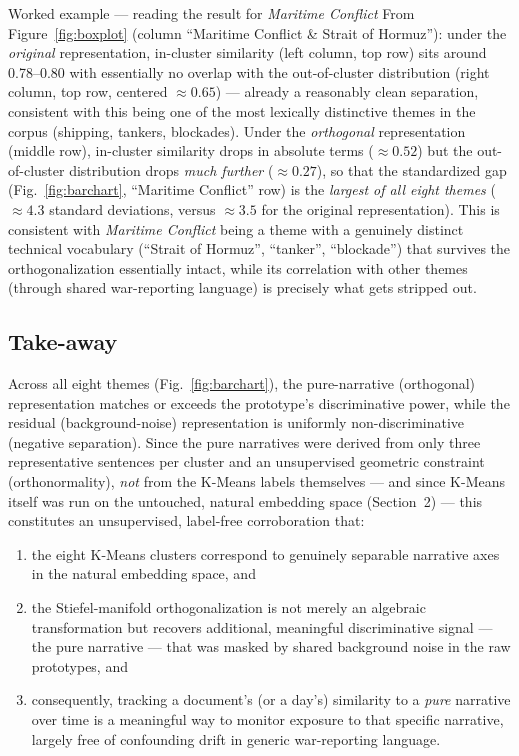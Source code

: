 \documentclass[11pt]{article}
\begin{document}
\begin{examplebox}{Worked example --- reading the result for \textit{Maritime Conflict}}
From Figure~\ref{fig:boxplot} (column ``Maritime Conflict \& Strait of
Hormuz''): under the \emph{original} representation, in-cluster similarity
(left column, top row) sits around 0.78--0.80 with essentially no overlap
with the out-of-cluster distribution (right column, top row, centered
$\approx 0.65$) --- already a reasonably clean separation, consistent with
this being one of the most lexically distinctive themes in the corpus
(shipping, tankers, blockades). Under the \emph{orthogonal} representation
(middle row), in-cluster similarity drops in absolute terms
($\approx 0.52$) but the out-of-cluster distribution drops \emph{much
further} ($\approx 0.27$), so that the standardized gap
(Fig.~\ref{fig:barchart}, ``Maritime Conflict'' row) is the \emph{largest of
all eight themes} ($\approx 4.3$ standard deviations, versus $\approx 3.5$
for the original representation). This is consistent with \textit{Maritime
Conflict} being a theme with a genuinely distinct technical vocabulary
(``Strait of Hormuz'', ``tanker'', ``blockade'') that survives the
orthogonalization essentially intact, while its correlation with other
themes (through shared war-reporting language) is precisely what gets
stripped out.
\end{examplebox}

\subsection{Take-away}
Across all eight themes (Fig.~\ref{fig:barchart}), the pure-narrative
(orthogonal) representation matches or exceeds the prototype's
discriminative power, while the residual (background-noise) representation
is uniformly non-discriminative (negative separation). Since the pure
narratives were derived from only three representative sentences per
cluster and an unsupervised geometric constraint (orthonormality),
\emph{not} from the K-Means labels themselves --- and since K-Means itself
was run on the untouched, natural embedding space (Section~2) --- this
constitutes an unsupervised, label-free corroboration that:
\begin{enumerate}
    \item the eight K-Means clusters correspond to genuinely separable narrative axes in the natural embedding space, and
    \item the Stiefel-manifold orthogonalization is not merely an algebraic transformation but recovers additional, meaningful discriminative signal --- the pure narrative --- that was masked by shared background noise in the raw prototypes, and
    \item consequently, tracking a document's (or a day's) similarity to a \emph{pure} narrative over time is a meaningful way to monitor exposure to that specific narrative, largely free of confounding drift in generic war-reporting language.
\end{enumerate}
\end{document}
